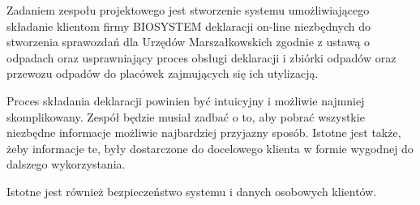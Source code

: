 

Zadaniem zespołu projektowego jest stworzenie systemu umożliwiającego składanie klientom firmy BIOSYSTEM deklaracji on-line niezbędnych do stworzenia sprawozdań dla Urzędów Marszałkowskich zgodnie z ustawą o odpadach oraz usprawniający proces obsługi deklaracji i zbiórki odpadów oraz przewozu odpadów do placówek zajmujących się ich utylizacją.

Proces składania deklaracji powinien być intuicyjny i możliwie najmniej skomplikowany. Zespół będzie musiał zadbać o to, aby pobrać wszystkie niezbędne informacje możliwie najbardziej przyjazny sposób. Istotne jest także, żeby informacje te, były dostarczone do docelowego klienta w formie wygodnej do dalszego wykorzystania.

Istotne jest również bezpieczeństwo systemu i danych osobowych klientów. 